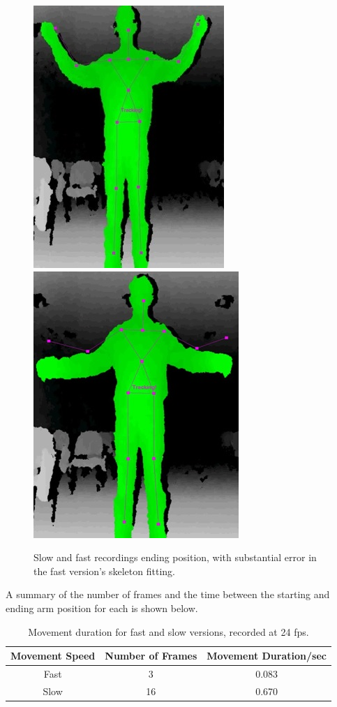 \documentclass[10pt]{article}
\begin{document}
\begin{figure}
\center
\includegraphics[scale=0.5]{SlowEnd.jpg} \includegraphics[scale=0.5]{FastEnd.jpg}
\caption{Slow and fast recordings ending position, with substantial error in the fast version's skeleton fitting.}
\end{figure}


\noindent A summary of the number of frames and the time between the starting and ending arm position for each  is shown below.

\begin{table}[H]
\center
\begin{tabular}{| c | c | c |}
\hline
Movement Speed & Number of Frames & Movement Duration/sec\\
\hline
Fast & 3 & 0.083\\
Slow & 16 & 0.670\\
\hline
\end{tabular}
\caption{Movement duration for fast and slow versions, recorded at 24 fps.}
\end{table}
\end{document}
